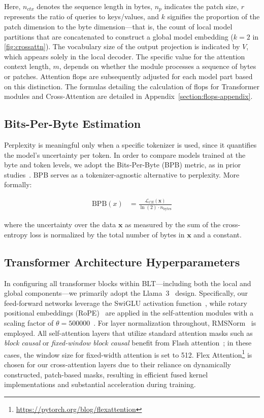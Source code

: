 Here, $n_{ctx}$ denotes the sequence length in bytes, $n_p$ indicates the patch size, $r$ represents the ratio of queries to keys/values, and $k$ signifies the proportion of the patch dimension to the byte dimension—that is, the count of local model partitions that are concatenated to construct a global model embedding ($k=2$ in \autoref{fig:crossattn}). The vocabulary size of the output projection is indicated by $V$, which appears solely in the local decoder. The specific value for the attention context length, $m$, depends on whether the module processes a sequence of bytes or patches. Attention flops are subsequently adjusted for each model part based on this distinction. The formulas detailing the calculation of flops for Transformer modules and Cross-Attention are detailed in Appendix~\ref{section:flops-appendix}.

\subsection{Bits-Per-Byte Estimation} Perplexity is meaningful only when a specific tokenizer is used, since it quantifies the model’s uncertainty per token. In order to compare models trained at the byte and token levels, we adopt the Bits-Per-Byte (BPB) metric, as in prior studies~\citep{xue2022byt5, yu2023megabyte, wang2024mambabyte}. BPB serves as a tokenizer-agnostic alternative to perplexity. More formally:

\begin{align}
    \text{BPB}(x)&= \frac{\mathcal{L}_{CE}(\pmb{x})}{\ln(2)\cdot n_{\text{bytes}}}
\end{align}

where the uncertainty over the data $\pmb{x}$ as measured by the sum of the cross-entropy loss is normalized by the total number of bytes in $\pmb{x}$ and a constant. 

\subsection{Transformer Architecture Hyperparameters} In configuring all transformer blocks within {\textsc BLT}—including both the local and global components—we primarily adopt the Llama~3~\citep{dubey2024llama} design. Specifically, our feed-forward networks leverage the SwiGLU activation function~\citep{swiglu}, while rotary positional embeddings (RoPE)~\citep{RoPe} are applied in the self-attention modules with a scaling factor of $\theta=500000$~\citep{xiong2024effective}. For layer normalization throughout, RMSNorm~\citep{RMSNorm} is employed. All self-attention layers that utilize standard attention masks such as \textit{block causal} or \textit{fixed-window block causal} benefit from Flash attention~\citep{dao2022flashattention}; in these cases, the window size for fixed-width attention is set to 512. Flex Attention\footnote{\url{https://pytorch.org/blog/flexattention}} is chosen for our cross-attention layers due to their reliance on dynamically constructed, patch-based masks, resulting in efficient fused kernel implementations and substantial acceleration during training.


